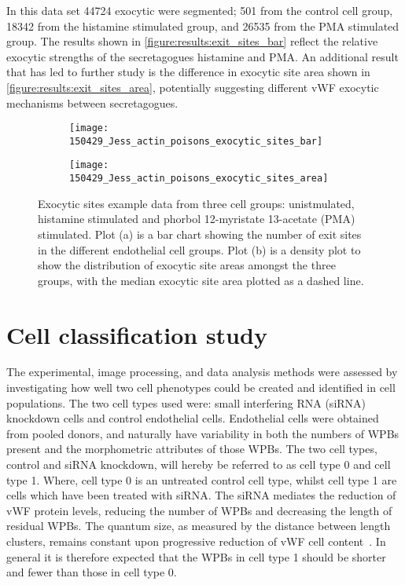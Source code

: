 In this data set 44724 exocytic were segmented; 501 from the control cell group, 18342 from the histamine stimulated group, and 26535 from the PMA stimulated group. The results shown in \autoref{figure:results:exit_sites_bar} reflect the relative exocytic strengths of the secretagogues histamine and PMA. An additional result that has led to further study is the difference in exocytic site area shown in \autoref{figure:results:exit_sites_area}, potentially suggesting different vWF exocytic mechanisms between secretagogues.

\begin{figure}[htbp]\centering
	\begin{subfigure}[b]{0.43\linewidth}
		\centering
		\texttt{[image: 150429\_Jess\_actin\_poisons\_exocytic\_sites\_bar]}
		\caption{}
		\label{figure:results:exit_sites_bar}
		\vspace{1ex}
	\end{subfigure}\hfill
	\begin{subfigure}[b]{0.43\linewidth}
		\centering
		\texttt{[image: 150429\_Jess\_actin\_poisons\_exocytic\_sites\_area]}
		\caption{}
		\label{figure:results:exit_sites_area}
		\vspace{1ex}
	\end{subfigure}
\caption[Results example from vWF exocytic sites]{Exocytic sites example data from three cell groups: unistmulated, histamine stimulated and phorbol 12-myristate 13-acetate (PMA) stimulated. Plot (a) is a bar chart showing the number of exit sites in the different endothelial cell groups. Plot (b) is a density plot to show the distribution of exocytic site areas amongst the three groups, with the median exocytic site area plotted as a dashed line.}
\label{figure:results:exit_sites}
\end{figure}

\section{Cell classification study}
\label{endothelial_morphometry:cell_classification}
The experimental, image processing, and data analysis methods were assessed by investigating how well two cell phenotypes could be created and identified in cell populations. The two cell types used were: small interfering RNA (siRNA) knockdown cells and control endothelial cells. Endothelial cells were obtained from pooled donors, and naturally have variability in both the numbers of WPBs present and the morphometric attributes of those WPBs. The two cell types, control and siRNA knockdown, will hereby be referred to as cell type 0 and cell type 1. Where, cell type 0 is an untreated control cell type, whilst cell type 1 are cells which have been treated with siRNA. The siRNA mediates the reduction of vWF protein levels, reducing the number of WPBs and decreasing the length of residual WPBs. The quantum size, as measured by the distance between length clusters, remains constant upon progressive reduction of vWF cell content~\cite{Ferraro2014}. In general it is therefore expected that the WPBs in cell type 1 should be shorter and fewer than those in cell type 0.

